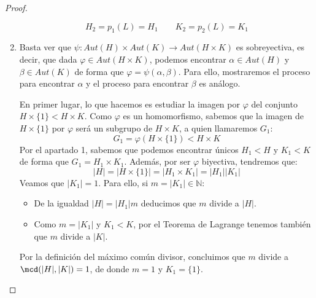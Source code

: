 \begin{teo}
\begin{proof}
\begin{enumerate}
                \begin{equation*}
                    H_2 = p_1(L) = H_1 \qquad K_2 = p_2(L) = K_1
                \end{equation*}
            \item Basta ver que $\psi:Aut(H)\times Aut(K)\to Aut(H\times K)$ es sobreyectiva, es decir, que dada $\varphi \in Aut(H\times K)$, podemos encontrar $\alpha\in Aut(H)$ y $\beta\in Aut(K)$ de forma que $\varphi = \psi(\alpha,\beta)$. Para ello, mostraremos el proceso para encontrar $\alpha$ y el proceso para encontrar $\beta$ es análogo. 

                En primer lugar, lo que hacemos es estudiar la imagen por $\varphi$ del conjunto $H\times \{1\} < H\times K$. Como $\varphi$ es un homomorfismo, sabemos que la imagen de $H\times \{1\}$ por $\varphi$ será un subgrupo de $H\times K$, a quien llamaremos $G_1$:
                \begin{equation*}
                    G_1 = \varphi(H\times \{1\}) < H\times K
                \end{equation*}
                Por el apartado 1, sabemos que podemos encontrar únicos $H_1 < H$ y $K_1 < K$ de forma que $G_1 = H_1\times K_1$. Además, por ser $\varphi$ biyectiva, tendremos que:
                \begin{equation*}
                    |H| = |H\times \{1\}| = |H_1\times K_1| = |H_1||K_1|
                \end{equation*}
                Veamos que $|K_1| = 1$. Para ello, si $m = |K_1| \in \mathbb{N}$: 
                \begin{itemize}
                    \item De la igualdad $|H| = |H_1| m$ deducimos que $m$ divide a $|H|$. 
                    \item Como $m = |K_1|$ y $K_1 < K$, por el Teorema de Lagrange tenemos también que $m$ divide a $|K|$.
                \end{itemize}
                Por la definición del máximo común divisor, concluimos que $m$ divide a \newline $\mcd(|H|,|K|) = 1$, de donde $m = 1$ y $K_1 = \{1\}$.


\end{enumerate}
\end{proof}
\end{teo}
